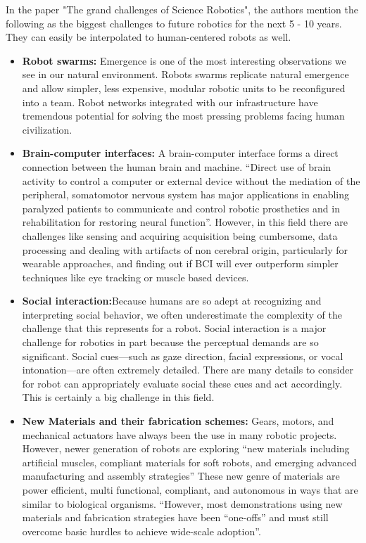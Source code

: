 \documentclass[conference]{IEEEtran}
\begin{document}
In the paper "The grand challenges of Science Robotics", the authors \textcite{yang2018grand} mention the following as the biggest challenges to future robotics for the next 5 - 10 years. They can easily be interpolated to human-centered robots as well.
\begin{itemize}
\item \textbf{Robot swarms:} Emergence is one of the most interesting observations we see in our natural environment. Robots swarms replicate natural emergence and allow simpler, less expensive, modular robotic units to be reconfigured into a team. Robot networks integrated with our infrastructure have tremendous potential for solving the most pressing problems facing human civilization. 
\item \textbf{Brain-computer interfaces:} A brain-computer interface forms a direct connection between the human brain and machine. ``Direct use of brain activity to control a computer or external device without the mediation of the peripheral, somatomotor nervous system has major applications in enabling paralyzed patients to communicate and control robotic prosthetics and in rehabilitation for restoring neural function''\autocite{yang2018grand}. However, in this field there are challenges like sensing and acquiring acquisition being cumbersome, data processing and dealing with artifacts of non cerebral origin, particularly for wearable approaches, and finding out if BCI will ever outperform simpler techniques like eye tracking or muscle based devices.
\item \textbf{Social interaction:}Because humans are so adept at recognizing and interpreting social behavior, we often underestimate the complexity of the challenge that this represents for a robot. Social interaction is a major challenge for robotics in part because the perceptual demands are so significant. Social cues—such as gaze direction, facial expressions, or vocal intonation—are often extremely detailed. There are many details to consider for robot can appropriately evaluate social these cues and act accordingly. This is certainly a big challenge in this field.
\item \textbf{New Materials and their fabrication schemes:} Gears, motors, and mechanical actuators have always been the use in many robotic projects. However, newer generation of robots are exploring ``new materials including artificial muscles, compliant materials for soft robots, and emerging advanced manufacturing and assembly strategies''\autocite{yang2018grand} These new genre of materials are power efficient, multi functional, compliant, and autonomous in ways that are similar to biological organisms. ``However, most demonstrations using new materials and fabrication strategies have been “one-offs” and must still overcome basic hurdles to achieve wide-scale adoption''\autocite{yang2018grand}. 

\end{itemize}
\end{document}
